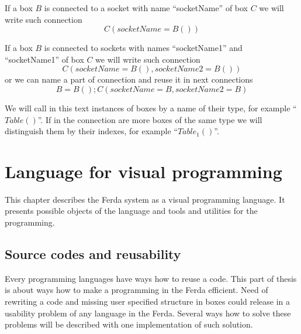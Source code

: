 \documentclass[a4paper,12pt]{book}
\begin{document}
If a box $B$ is connected to a socket with name ``socketName'' of box $C$ we will write such connection
\begin{equation}
C(socketName=B())
\end{equation}

If a box $B$ is connected to sockets with names ``socketName1'' and ``socketName1'' of box $C$ we will write such connection
\begin{equation}
C(socketName=B(), socketName2=B())
\end{equation}
or we can name a part of connection and reuse it in next connections
\begin{equation}
B=B(); C(socketName=B, socketName2=B)
\end{equation}

We will call in this text instances of boxes by a name of their type, for example ``$Table()$''. If in the connection are more boxes of the same type we will distinguish them by their indexes, for example ``$Table_1()$''.


\chapter{Language for visual programming}
This chapter describes the Ferda system as a visual programming language. It presents possible objects of the language and tools and utilities for the programming.

\section{Source codes and reusability}
Every programming languages have ways how to reuse a code. This part of thesis is about ways how to make a programming in the Ferda efficient. Need of rewriting a code and missing user specified structure in boxes could release in a usability problem of any language in the Ferda. Several ways how to solve these problems will be described with one implementation of such solution.
\end{document}
